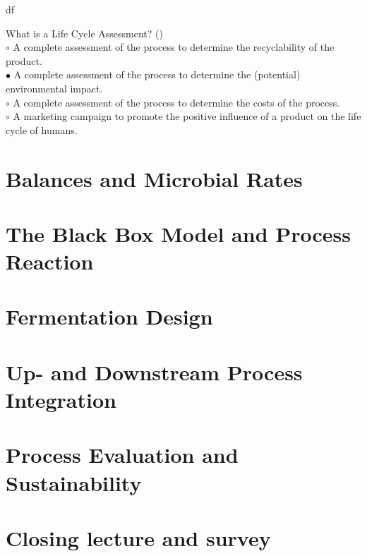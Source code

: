 df\documentclass[]{beamer}
\begin{document}
\begin{CJK}{UTF8}{gbsn}
\begin{frame}[shrink] {}
\end{frame}
\begin{frame}[shrink] {}
\addtocounter{answers}{1}
\color{blue}
What is a Life Cycle Assessment?
({})\\
\color{black}
\setlength{\parindent}{-0.4cm}
{\color{red}$\circ$} A complete assessment of the process to determine the recyclability of the product.  \\
{\color{red}$\bullet$} A complete assessment of the process to determine the (potential) environmental impact.  \\
{\color{red}$\circ$} A complete assessment of the process to determine the costs of the process.  \\
{\color{red}$\circ$} A marketing campaign to promote the positive influence of a product on the life cycle of humans.  \\

\end{frame}
\section{Balances and Microbial Rates}
\section{The Black Box Model and Process Reaction}
\section{Fermentation Design}
\section{Up- and Downstream Process Integration}
\section{Process Evaluation and Sustainability}
\section{Closing lecture and survey}

\end{CJK}
\end{document}
